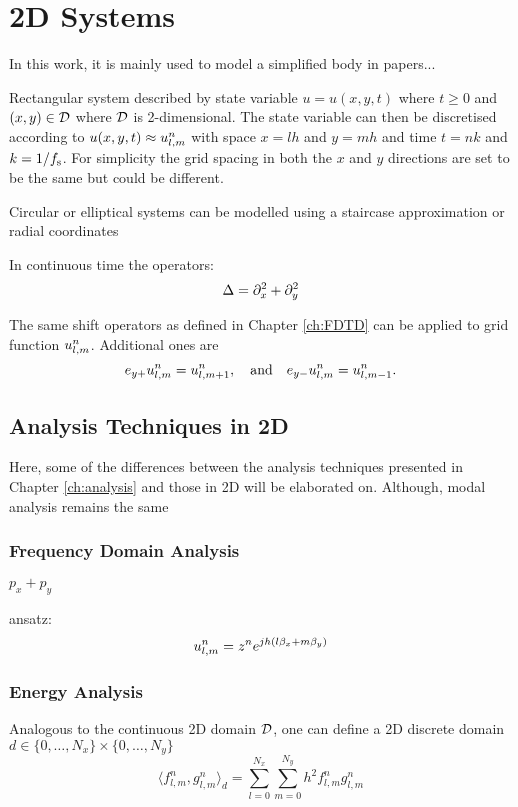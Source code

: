 \chapter{2D Systems}\label{ch:2Dsyst}


In this work, it is mainly used to model a simplified body in papers...


Rectangular system described by state variable $u = u(x,y,t)$  where $t\geq 0$ and $(x,y) \in \mathcal{D}$ where $\mathcal{D}$ is 2-dimensional. The state variable can then be discretised according to $u(x, y, t) \approx u_{l,m}^n$ with space $x = lh$ and $y = mh$ and time $t = nk$ and $k=1/f_\text{s}$. For simplicity the grid spacing in both the $x$ and $y$ directions are set to be the same but could be different.

Circular or elliptical systems can be modelled using a staircase approximation or radial coordinates \cite{theBible}

In continuous time the  operators:
\begin{equation}\label{eq:laplacian}
    \Delta = \partial_x^2 + \partial_y^2
\end{equation}


The same shift operators as defined in Chapter \ref{ch:FDTD} can be applied to grid function $u_{l,m}^n$. Additional ones are
\begin{equation}
    e_{y+}u_{l,m}^n = u_{l, m+1}^n,\quad \text{and}\quad e_{y-}u_{l,m}^n= u_{l, m-1}^n.
\end{equation}

\section{Analysis Techniques in 2D}\label{sec:analysis2D}
Here, some of the differences between the analysis techniques presented in Chapter \ref{ch:analysis} and those in 2D will be elaborated on. Although, modal analysis remains the same

\subsection{Frequency Domain Analysis}
$p_x + p_y$

ansatz:
\begin{equation}
    u_{l,m}^n = z^n e^{jh(l\beta_x + m\beta_y)}
\end{equation}

\subsection{Energy Analysis}
Analogous to the continuous 2D domain $\mathcal{D}$, one can define a 2D discrete domain $d\in \{0, \hdots, N_x\} \times \{0, \hdots, N_y\}$
\begin{equation}\label{eq:2DInnerProd}
    \langle f^n_{l, m}, g^n_{l, m} \rangle_d = \sum_{l = 0}^{N_x}\sum_{m = 0}^{N_y} h^2 f_{l,m}^n g_{l,m}^n
\end{equation}

